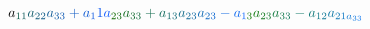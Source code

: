 \documentclass[12pt]{article}
\begin{document}
\begin{displaymath}
{a} _ { \mathcolor[RGB]{15,90,75}{1} \mathcolor[RGB]{15,90,90}{1} } \mathcolor[RGB]{15,90,105}{a} _ { \mathcolor[RGB]{15,90,120}{2} \mathcolor[RGB]{15,90,135}{2} } \mathcolor[RGB]{15,90,150}{a} _ { \mathcolor[RGB]{15,90,165}{3} \mathcolor[RGB]{15,90,180}{3} } \mathcolor[RGB]{15,90,195}{+} \mathcolor[RGB]{15,90,210}{a} _ { \mathcolor[RGB]{15,90,225}{1} } \mathcolor[RGB]{15,90,240}{1} \mathcolor[RGB]{15,90,255}{a} _ { \mathcolor[RGB]{15,105,0}{2} \mathcolor[RGB]{15,105,15}{3} } \mathcolor[RGB]{15,105,30}{a} _ { \mathcolor[RGB]{15,105,45}{3} \mathcolor[RGB]{15,105,60}{3} } \mathcolor[RGB]{15,105,75}{+} \mathcolor[RGB]{15,105,90}{a} _ { \mathcolor[RGB]{15,105,105}{1} \mathcolor[RGB]{15,105,120}{3} } \mathcolor[RGB]{15,105,135}{a} _ { \mathcolor[RGB]{15,105,150}{2} \mathcolor[RGB]{15,105,165}{3} } \mathcolor[RGB]{15,105,180}{a} _ { \mathcolor[RGB]{15,105,195}{2} \mathcolor[RGB]{15,105,210}{3} } \mathcolor[RGB]{15,105,225}{-} \mathcolor[RGB]{15,105,240}{a} _ { \mathcolor[RGB]{15,105,255}{1} \mathcolor[RGB]{15,120,0}{3} } \mathcolor[RGB]{15,120,15}{a} _ { \mathcolor[RGB]{15,120,30}{2} \mathcolor[RGB]{15,120,45}{3} } \mathcolor[RGB]{15,120,60}{a} _ { \mathcolor[RGB]{15,120,75}{3} \mathcolor[RGB]{15,120,90}{3} } \mathcolor[RGB]{15,120,105}{-} \mathcolor[RGB]{15,120,120}{a} _ { \mathcolor[RGB]{15,120,135}{1} \mathcolor[RGB]{15,120,150}{2} } \mathcolor[RGB]{15,120,165}{a} _ { \mathcolor[RGB]{15,120,180}{2} \mathcolor[RGB]{15,120,195}{1} \mathcolor[RGB]{15,120,210}{a} _ { \mathcolor[RGB]{15,120,225}{3} \mathcolor[RGB]{15,120,240}{3} } }
\end{displaymath}
\end{document}
